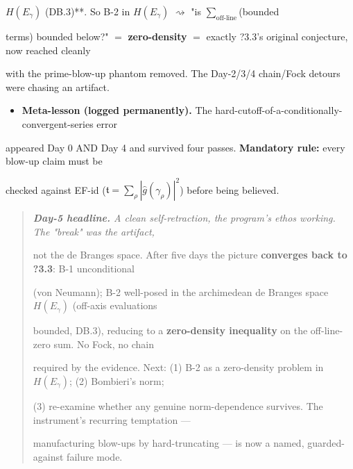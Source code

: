\documentclass[10pt]{article}
\begin{document}
  $H(E_\gamma)$ (DB.3)**. So B-2 in $H(E_\gamma)$ $\rightsquigarrow$ "is $\sum_{\text{off-line}}$(bounded\par
  terms) bounded below?" $=$ \textbf{zero-density} $=$ exactly ?3.3's original conjecture, now reached cleanly\par
  with the prime-blow-up phantom removed. The Day-2/3/4 chain/Fock detours were chasing an artifact.\par
\begin{itemize}
\item \textbf{Meta-lesson (logged permanently).} The hard-cutoff-of-a-conditionally-convergent-series error
\end{itemize}
  appeared Day 0 AND Day 4 and survived four passes. \textbf{Mandatory rule:} every blow-up claim must be\par
  checked against EF-id ($\mathfrak t=\sum_\rho|\widehat g(\gamma_\rho)|^2$) before being believed.\par

\begin{quote}\itshape
\textbf{Day-5 headline.} A clean self-retraction, the program's ethos working. The "break" was the artifact,\par
not the de Branges space. After five days the picture \textbf{converges back to ?3.3}: B-1 unconditional\par
(von Neumann); B-2 well-posed in the archimedean de Branges space $H(E_\gamma)$ (off-axis evaluations\par
bounded, DB.3), reducing to a \textbf{zero-density inequality} on the off-line-zero sum. No Fock, no chain\par
required by the evidence. Next: (1) B-2 as a zero-density problem in $H(E_\gamma)$; (2) Bombieri's norm;\par
(3) re-examine whether any genuine norm-dependence survives. The instrument's recurring temptation ---\par
manufacturing blow-ups by hard-truncating --- is now a named, guarded-against failure mode.\par
\end{quote}
\end{document}

